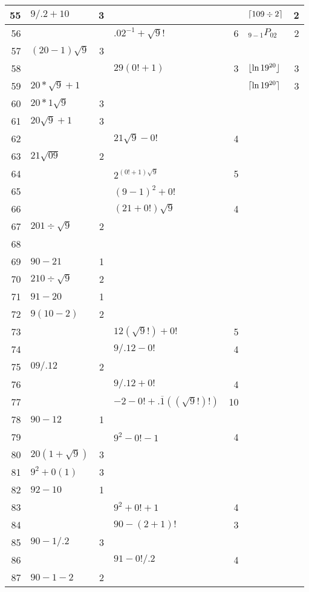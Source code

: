 \begin{longtable}{r l r l r l r}
55 & $9/.2 + 10$ & 3 & & & $\lceil109\div2\rceil$ & 2 \\ \midrule
56 & & & $.02^{-1}+\sqrt{9}!$ & 6 & $_{9-1}P_{02}$ & 2 \\ \midrule
57 & $(20-1)\sqrt{9}$ & 3 \\ \midrule
58 & & & $29(0!+1)$ & 3 & $\lfloor\ln 19^{20}\rfloor$ & 3 \\ \midrule
59 & $20*\sqrt{9}+1$ & & & & $\lceil\ln 19^{20}\rceil$ & 3 \\ \midrule
\midrule
60 & $20*1\sqrt{9}$ & 3 \\ \midrule
61 & $20\sqrt{9}+1$ & 3 \\ \midrule
62 & & & $21\sqrt{9}-0!$ & 4\\ \midrule
63 & $21\sqrt{09}$ & 2 \\ \midrule
64 & & & $2^{(0!+1)\sqrt{9}}$ & 5 \\ \midrule
65 & & & $(9-1)^2+0!$ \\ \midrule
66 & & & $(21+0!)\sqrt{9}$ & 4\\ \midrule
67 & $201 \div\sqrt{9}$ & 2 \\ \midrule
68 & & \\ \midrule
69 & $90-21$ & 1 \\ \midrule
\midrule
70 & $210 \div\sqrt{9}$ & 2 \\ \midrule
71 & $91-20$ & 1 \\ \midrule
72 & $9(10-2)$ & 2 \\ \midrule
73 & & & $12(\sqrt{9}!)+0!$ & 5\\ \midrule
74 & & & $9/.12-0!$ & 4 \\ \midrule
75 & $09/.12$ & 2 \\ \midrule
76 & & & $9/.12 + 0!$ & 4 \\ \midrule
77 & & & $-2-0!+.\overline{1}((\sqrt{9}!)!)$ & 10\\ \midrule
78 & $90-12$ & 1 \\ \midrule
79 & & & $9^2-0!-1$ & 4 \\ \midrule
\midrule
80 & $20(1+\sqrt{9})$ & 3 \\ \midrule
81 & $9^2 + 0(1)$ & 3\\ \midrule
82 & $92-10$ & 1 \\ \midrule
83 & & & $9^2+0!+1$ & 4 \\ \midrule
84 & & & $90-(2+1)!$ & 3\\ \midrule
85 & $90-1/.2$ & 3 \\ \midrule
86 & & & $91-0!/.2$ & 4\\ \midrule
87 & $90-1-2$ & 2 \\ \midrule

\end{longtable}
